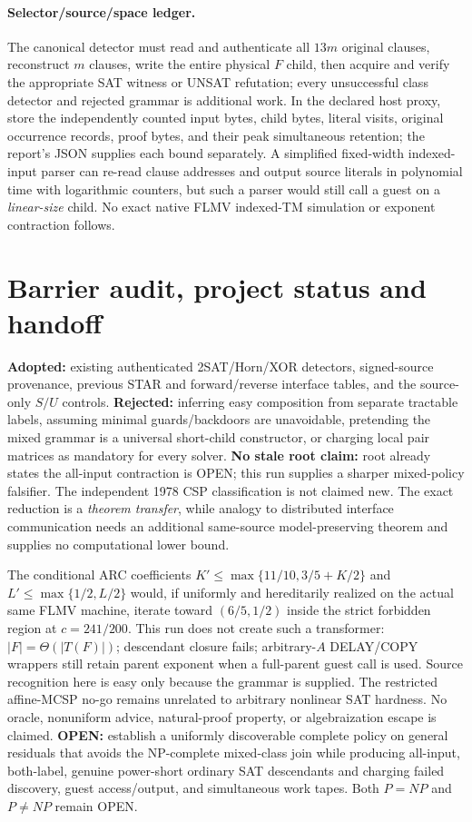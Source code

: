 \documentclass[11pt]{article}
\begin{document}
\paragraph{Selector/source/space ledger.}
The canonical detector must read and authenticate all $13m$ original clauses, reconstruct $m$ clauses, write the entire physical $F$ child, then acquire and verify the appropriate SAT witness or UNSAT refutation; every unsuccessful class detector and rejected grammar is additional work. In the declared host proxy, store the independently counted input bytes, child bytes, literal visits, original occurrence records, proof bytes, and their peak simultaneous retention; the report's JSON supplies each bound separately. A simplified fixed-width indexed-input parser can re-read clause addresses and output source literals in polynomial time with logarithmic counters, but such a parser would still call a guest on a \emph{linear-size} child. No exact native FLMV indexed-TM simulation or exponent contraction follows.

\section{Barrier audit, project status and handoff}
\noindent\textbf{Adopted:} existing authenticated 2SAT/Horn/XOR detectors, signed-source provenance, previous STAR and forward/reverse interface tables, and the source-only $S/U$ controls. \textbf{Rejected:} inferring easy composition from separate tractable labels, assuming minimal guards/backdoors are unavoidable, pretending the mixed grammar is a universal short-child constructor, or charging local pair matrices as mandatory for every solver. \textbf{No stale root claim:} root already states the all-input contraction is OPEN; this run supplies a sharper mixed-policy falsifier. The independent 1978 CSP classification is not claimed new. The exact reduction is a \emph{theorem transfer}, while analogy to distributed interface communication needs an additional same-source model-preserving theorem and supplies no computational lower bound.

The conditional ARC coefficients $K'\le\max\{11/10,3/5+K/2\}$ and $L'\le\max\{1/2,L/2\}$ would, if uniformly and hereditarily realized on the actual same FLMV machine, iterate toward $(6/5,1/2)$ inside the strict forbidden region at $c=241/200$. This run does not create such a transformer: $|F|=\Theta(|T(F)|)$; descendant closure fails; arbitrary-$A$ DELAY/COPY wrappers still retain parent exponent when a full-parent guest call is used. Source recognition here is easy only because the grammar is supplied. The restricted affine-MCSP no-go remains unrelated to arbitrary nonlinear SAT hardness. No oracle, nonuniform advice, natural-proof property, or algebraization escape is claimed. \textbf{OPEN:} establish a uniformly discoverable complete policy on general residuals that avoids the NP-complete mixed-class join while producing all-input, both-label, genuine power-short ordinary SAT descendants and charging failed discovery, guest access/output, and simultaneous work tapes. Both $P=NP$ and $P\ne NP$ remain OPEN.
\end{document}
